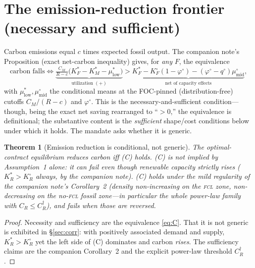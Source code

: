 \documentclass[11pt,reqno]{amsart}
\theoremstyle{plain}
\newtheorem{theorem}{Theorem}
\theoremstyle{definition}
\theoremstyle{remark}
\newcommand{\KRs}{K_R^{*}}\newcommand{\KFs}{K_F^{*}}\newcommand{\KMs}{K_M^{*}}
\newcommand{\KRo}{K_R^{\circ}}\newcommand{\KFo}{K_F^{\circ}}
\newcommand{\CM}{C_M}\newcommand{\CF}{C_F}\newcommand{\CR}{C_R}
\begin{document}
\section{The emission-reduction frontier (necessary and sufficient)}\label{sec:ns}

Carbon emissions equal $c$ times expected fossil output. The companion note's
Proposition (exact net-carbon inequality) gives, for \emph{any} $F$, the equivalence
\begin{equation}\label{eq:C}
  \text{carbon falls}
  \iff
  \underbrace{\tfrac{\CM}{R-c}\big(\KFs-\KMs-\mu^{*}_{\mathrm{low}}\big)}_{\text{utilization }(+)}
  >
  \underbrace{\KFs-\KFo(1-\varphi^{\circ})-(\varphi^{\circ}-q^{\circ})\mu^{\circ}_{\mathrm{mid}}}_{\text{net of capacity effects}},
  \tag{C}
\end{equation}
with $\mu^{*}_{\mathrm{low}},\mu^{\circ}_{\mathrm{mid}}$ the conditional means at
the FOC-pinned (distribution-free) cutoffs $\CM/(R-c)$ and $\varphi^{\circ}$. This
is the necessary-and-sufficient condition---though, being the exact net saving rearranged
to ``$>0$,'' the equivalence is definitional; the substantive content is the \emph{sufficient}
shape/cost conditions below under which it holds. The mandate asks whether it is generic.

\begin{theorem}[Emission reduction is conditional, not generic]\label{thm:ns}
The optimal-contract equilibrium reduces carbon \emph{iff} \textup{(C)} holds.
\textup{(C)} is \emph{not} implied by Assumption~1 alone: it can fail even though
renewable capacity strictly rises ($\KRs>\KRo$ always, by the companion note).
\textup{(C)} holds under the mild regularity of the companion note's
Corollary~2 (density non-increasing on the \textsc{fcl} zone, non-decreasing on
the no-\textsc{fcl} fossil zone---in particular the whole power-law family with
$\CR\le\CR^{\dagger}$), and fails when those are reversed.
\end{theorem}

\begin{proof}
Necessity and sufficiency are the equivalence \eqref{eq:C}. That it is not generic
is exhibited in \S\ref{sec:corr}: with positively associated demand and supply,
$\KRs>\KRo$ yet the left side of (C) dominates and carbon \emph{rises}. The
sufficiency claims are the companion Corollary~2 and the explicit power-law
threshold $\CR^{\dagger}$.
\end{proof}
\end{document}
